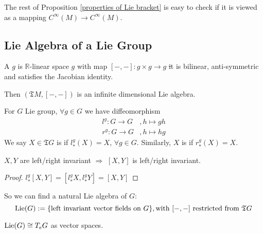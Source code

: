 
The rest of Proposition \ref{properties of Lie bracket} is easy to check if it is viewed as a mapping  $ C^\infty(M)\rightarrow C^\infty(M) $.

\subsection{Lie Algebra of a Lie Group}
\begin{definition}
    A  $ g $ is  $ \mathbb{R} $-linear space  $ g $ with map   $ [-,-]:g\times g\rightarrow g $ \st it is bilinear, anti-symmetric and satisfies the Jacobian identity.
    
    Then  $ (\mathfrak{T}M,[-,-]) $ is an infinite dimensional Lie algebra.
\end{definition}
For  $ G $ Lie group,  $ \forall g\in G $ we have diffeomorphism  
\begin{align*}
    l^g:G\rightarrow G&,h\mapsto gh\\
    r^g:G\rightarrow G&,h\mapsto hg   
\end{align*}
We say  $ X\in \mathfrak{T}G $ is  if  $ l_*^g(X)=X $,  $ \forall g\in G $. Similarly,  $ X $ is  if  $ r_*^g(X)=X $.   
\begin{proposition}
     $ X,Y $ are left/right invariant  $ \Rightarrow  $  $ [X,Y] $ is left/right invariant.  
\end{proposition}
\begin{proof}
     $ l_*^g[X,Y]=[l_*^gX,l_*^gY]=[X,Y] $ 
\end{proof}
So we can find a natural Lie algebra of  $ G $: 
\[\name{$ \Lie(G) $}:=\{\text{left invariant vector fields on  $ G $}\},\text{with  $ [-,-] $ restricted from  $ \mathfrak{T}G $}\]
\begin{corollary}
     $ \displaystyle \mathrm{Lie}(G)\cong T_eG $ as vector spaces. 
\end{corollary}
